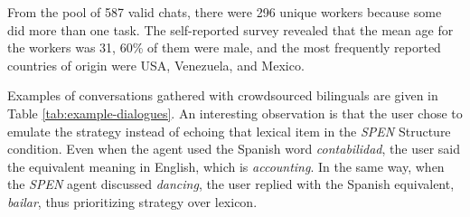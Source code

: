 \documentclass[11pt,a4paper]{article}
\begin{document}
From the pool of 587 valid chats, there were 296 unique workers because some did more than one task. 
The self-reported survey revealed that the mean age for the workers was 31, 60\% of them were male, and the most frequently reported countries of origin were USA, Venezuela, and Mexico.

Examples of conversations gathered with crowdsourced bilinguals are given in Table \ref{tab:example-dialogues}.
An interesting observation is that the user chose to emulate the strategy instead of echoing that lexical item in the \textit{SP\textrightarrow EN} Structure condition.
Even when the agent used the Spanish word \textit{contabilidad}, the user said the equivalent meaning in English, which is \textit{accounting}.
In the same way, when the \textit{SP\textrightarrow EN} agent discussed \textit{dancing}, the user replied with the Spanish equivalent, \textit{bailar}, thus prioritizing strategy over lexicon.
\end{document}
